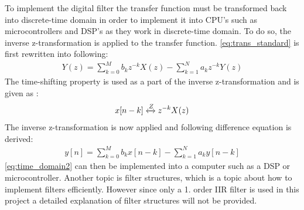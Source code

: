 To implement the digital filter the transfer function must be transformed back into discrete-time domain in order to implement it into CPU's such as microcontrollers and DSP's as they work in discrete-time domain. To do so, the inverse z-transformation is applied to the transfer function. \autoref{eq:trans_standard} is first rewritten into following:
\begin{align}
Y(z) = \sum\limits_{k=0}^{M}b_kz^{-k}X(z) -\sum\limits_{k=1}^{N}a_kz^{-k}Y(z)
\label{eq:z_domain_trans}
\end{align}
The time-shifting property is used as a part of the inverse z-transformation and is given as \citep{Oppenheim}:
\begin{align}
x[n-k] \xleftrightarrow{Z} z^{-k} X(z)
\label{eq:time_shifting}
\end{align}
The inverse z-transformation is now applied and following difference equation is derived:
\begin{align}
y[n] =  \sum\limits_{k=0}^{M}b_kx[n-k] -\sum\limits_{k=1}^{N}a_ky[n-k]
\label{eq:time_domain2}
\end{align}
\autoref{eq:time_domain2} can then be implemented into a computer such as a DSP or microcontroller. Another topic is filter structures, which is a topic about how to implement filters efficiently. However since only a 1. order IIR filter is used in this project a detailed explanation of filter structures will not be provided.










